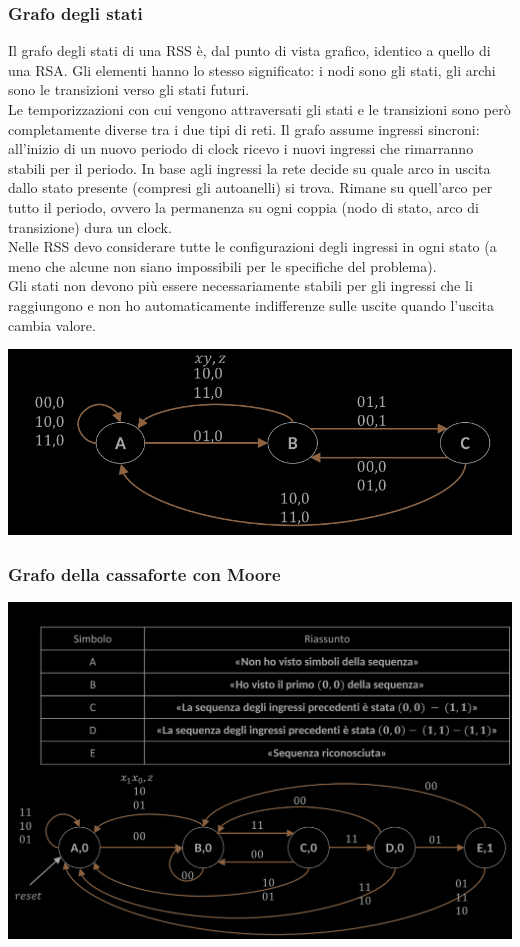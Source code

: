\documentclass{article}
\begin{document}
\subsubsection{Grafo degli stati}
Il grafo degli stati di una RSS è, dal punto di vista grafico, identico a quello di una RSA. Gli elementi hanno lo stesso significato: i nodi sono gli stati, gli archi sono le transizioni verso gli stati futuri.\\
Le temporizzazioni con cui vengono attraversati gli stati e le transizioni sono però completamente diverse tra i due tipi di reti. Il grafo assume ingressi sincroni: all’inizio di un nuovo periodo di clock ricevo i nuovi ingressi che rimarranno stabili per il periodo. In base agli ingressi la rete decide su quale arco in uscita dallo stato presente (compresi gli autoanelli) si trova. Rimane su quell’arco per tutto il periodo, ovvero la permanenza su ogni coppia (nodo di stato, arco di transizione) dura un clock.\\
Nelle RSS devo considerare tutte le configurazioni degli ingressi in ogni stato (a meno che alcune non siano impossibili per le specifiche del problema).\\
Gli stati non devono più essere necessariamente stabili per gli ingressi che li raggiungono e non ho automaticamente indifferenze sulle uscite quando l’uscita cambia valore.
\begin{center}
    \includegraphics[scale=0.4]{grafo-rss-1.png}
\end{center}
\subsubsection*{Grafo della cassaforte con Moore}
\begin{center}
    \includegraphics[scale=0.4]{grafo-cassaforte-moore.png}
\end{center}
\end{document}
